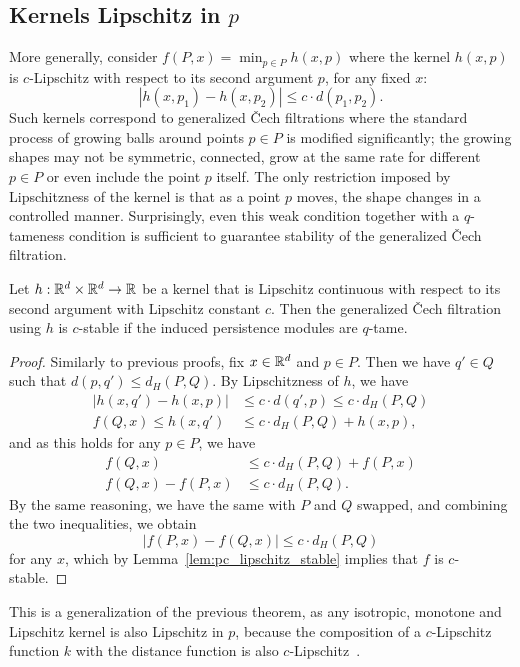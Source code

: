 \subsection{Kernels Lipschitz in $p$}

More generally, consider $f(P, x) = \min_{p \in P} h(x, p)$ where the kernel
$h(x, p)$ is $c$-Lipschitz with respect to its second argument $p$, for any
fixed $x$:
\begin{equation}
    |h(x, p_1) - h(x, p_2)| \leq c \cdot d(p_1, p_2).
\end{equation}
Such kernels correspond to generalized \v{C}ech filtrations where the standard
process of growing balls around points $p \in P$ is modified significantly;
the growing shapes may not be symmetric, connected, grow at the same rate for
different $p \in P$ or even include the point $p$ itself. The only restriction
imposed by Lipschitzness of the kernel is that as a point $p$ moves, the shape
changes in a controlled manner. Surprisingly, even this weak condition together
with a $q$-tameness condition is sufficient to guarantee stability of the
generalized \v{C}ech filtration.
\begin{theorem}
    Let $h : \mathbb{R}^d \times \mathbb{R}^d \to \mathbb{R}$ be a kernel that is Lipschitz continuous
    with respect to its second argument with Lipschitz constant $c$. Then the
    generalized \v{C}ech filtration using $h$ is $c$-stable if the induced
    persistence modules are $q$-tame.
\end{theorem}
\begin{proof}
    Similarly to previous proofs, fix $x \in \mathbb{R}^d$ and $p \in P$.
    Then we have $q' \in Q$ such that $d(p, q') \leq d_H(P, Q)$.
    By Lipschitzness of $h$, we have
    \begin{align}
        |h(x, q') - h(x, p)| & \leq c \cdot d(q', p) \leq c \cdot d_H(P, Q) \\
        f(Q, x) \leq h(x, q') & \leq c \cdot d_H(P, Q) + h(x, p),
    \end{align}
    and as this holds for any $p \in P$, we have
    \begin{align}
        f(Q, x) & \leq c \cdot d_H(P, Q) + f(P, x) \\
        f(Q, x) - f(P, x) & \leq c \cdot d_H(P, Q).
    \end{align}
    By the same reasoning, we have the same with $P$ and $Q$ swapped,
    and combining the two inequalities, we obtain
    \begin{equation}
        |f(P, x) - f(Q, x)| \leq c \cdot d_H(P, Q)
    \end{equation}
    for any $x$, which by Lemma~\ref{lem:pc_lipschitz_stable} implies that
    $f$ is $c$-stable.
\end{proof}
This is a generalization of the previous theorem, as any isotropic, monotone and
Lipschitz kernel is also Lipschitz in $p$, because the composition of a
$c$-Lipschitz function $k$ with the distance function is also
$c$-Lipschitz~\cite{weaver2018lipschitz}.

